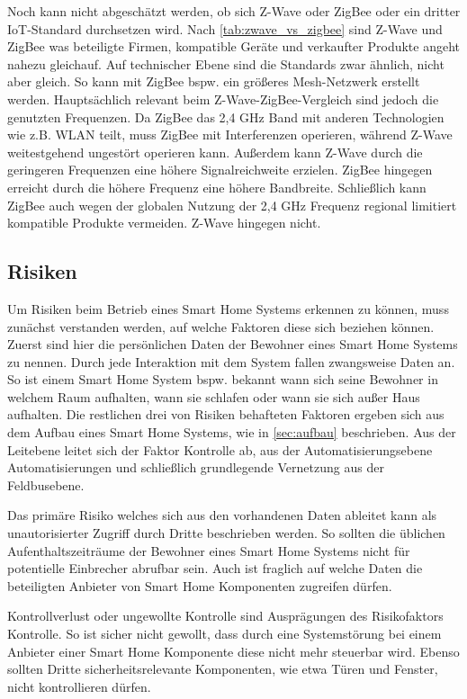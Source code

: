 Noch kann nicht abgeschätzt werden, ob sich Z-Wave oder ZigBee oder ein dritter \ac{IoT}-Standard durchsetzen wird.
Nach \autoref{tab:zwave_vs_zigbee} sind Z-Wave und ZigBee was beteiligte Firmen, kompatible Geräte und verkaufter Produkte angeht nahezu gleichauf.
Auf technischer Ebene sind die Standards zwar ähnlich, nicht aber gleich.
So kann mit ZigBee bspw. ein größeres Mesh-Netzwerk erstellt werden.
Hauptsächlich relevant beim Z-Wave-ZigBee-Vergleich sind jedoch die genutzten Frequenzen.
Da ZigBee das 2,4 GHz Band mit anderen Technologien wie z.B. \ac{WLAN} teilt, muss ZigBee mit Interferenzen operieren, während Z-Wave weitestgehend ungestört operieren kann.
Außerdem kann Z-Wave durch die geringeren Frequenzen eine höhere Signalreichweite erzielen.
ZigBee hingegen erreicht durch die höhere Frequenz eine höhere Bandbreite.
Schließlich kann ZigBee auch wegen der globalen Nutzung der 2,4 GHz Frequenz regional limitiert kompatible Produkte vermeiden.
Z-Wave hingegen nicht.

\subsection{Risiken}

Um Risiken beim Betrieb eines Smart Home Systems erkennen zu können, muss zunächst verstanden werden, auf welche Faktoren diese sich beziehen können.
Zuerst sind hier die persönlichen Daten der Bewohner eines Smart Home Systems zu nennen.
Durch jede Interaktion mit dem System fallen zwangsweise Daten an.
So ist einem Smart Home System bspw. bekannt wann sich seine Bewohner in welchem Raum aufhalten, wann sie schlafen oder wann sie sich außer Haus aufhalten.
Die restlichen drei von Risiken behafteten Faktoren ergeben sich aus dem Aufbau eines Smart Home Systems, wie in \autoref{sec:aufbau} beschrieben.
Aus der Leitebene leitet sich der Faktor Kontrolle ab, aus der Automatisierungsebene Automatisierungen und schließlich grundlegende Vernetzung aus der Feldbusebene.

Das primäre Risiko welches sich aus den vorhandenen Daten ableitet kann als unautorisierter Zugriff durch Dritte beschrieben werden.
So sollten die üblichen Aufenthaltszeiträume der Bewohner eines Smart Home Systems nicht für potentielle Einbrecher abrufbar sein.
Auch ist fraglich auf welche Daten die beteiligten Anbieter von Smart Home Komponenten zugreifen dürfen.

Kontrollverlust oder ungewollte Kontrolle sind Ausprägungen des Risikofaktors Kontrolle.
So ist sicher nicht gewollt, dass durch eine Systemstörung bei einem Anbieter einer Smart Home Komponente diese nicht mehr steuerbar wird.
Ebenso sollten Dritte sicherheitsrelevante Komponenten, wie etwa Türen und Fenster, nicht kontrollieren dürfen.

